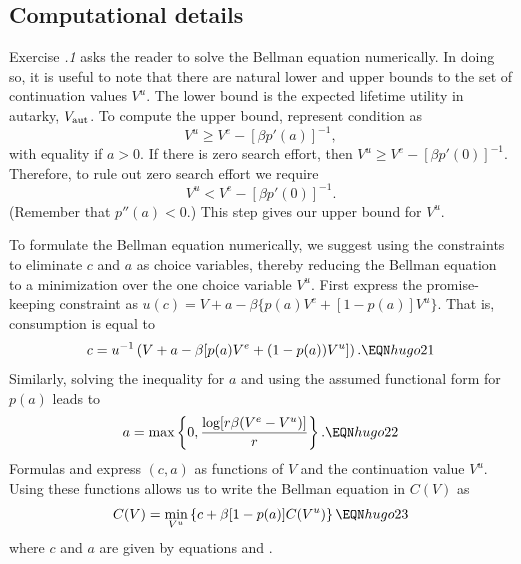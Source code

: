 \subsection{Computational details}
Exercise {\it \the\chapternum.1\/} asks the reader  to solve the Bellman equation
numerically. %
In doing so, it is useful to note that there
are natural lower and upper bounds to the set
of continuation values $V^u$. The lower bound is
the expected lifetime utility in autarky,
$V_{\rm aut}$. To compute the upper bound,
represent condition  as
$$ V^u \geq V^e  - [\beta  p'(a)]^{-1},$$
with equality if $ a > 0$.
If there is zero search effort, then $V^u \geq V^e -[\beta p'(0)]^{-1}$.  %
Therefore, to rule out zero search effort we require
$$ V^u < V^e - [\beta p'(0)]^{-1} .$$                                     %
(Remember that $p''(a) < 0$.)  This step gives  our upper bound
for $V^u$.

To formulate the Bellman equation numerically,
we suggest using the constraints to eliminate $c$ and $a$ as choice
variables, thereby reducing the Bellman equation to
a minimization over the one choice variable $V^u$.
First express the promise-keeping constraint  as
$u(c) = V + a - \beta \{p(a) V^e +[1-p(a)] V^u \}$.                       %
That is, consumption is equal to
$$ c = u^{-1}\left(
     V+a -\beta [p(a)V^e + (1-p(a))V^u] \right). \EQN hugo21$$
Similarly, solving the inequality  for $a$ and using the
assumed  functional
form for $p(a)$  leads to
$$ a = \max\left\{0, {\log[r \beta (V^e - V^u)] \over r } \right\}.
             \EQN hugo22 $$
Formulas  and  express $(c,a)$ as functions
of $V$ and  the continuation value $V^u$.  Using these functions
allows us to write the Bellman equation in $C(V)$ as
$$ C(V)  = \min_{V^u} \left\{ c + \beta [1 - p(a)] C(V^u) \right\} \EQN hugo23 $$
where $c$ and $a$ are given by equations  and .


